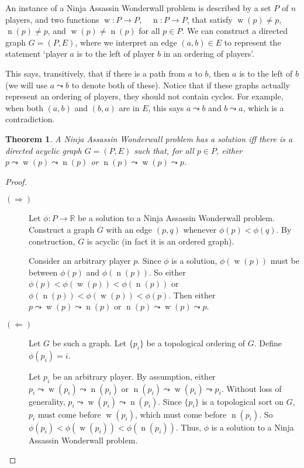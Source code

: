 \documentclass{article}
\newtheorem*{thm}{Theorem}
\DeclareMathOperator{\w}{w}
\DeclareMathOperator{\n}{n}
\begin{document}
An instance of a Ninja Assassin Wonderwall problem is described by a set $P$ of $n$ players, and two functions $\w : P \to P, \quad \n : P \to P$, that satisfy $\w(p) \neq p$, $\n(p) \neq p$, and $\w(p) \neq \n(p)$ for all $p\in P$. We can construct a directed graph $G=(P,E)$, where we interpret an edge $(a,b) \in E$ to represent the statement `player $a$ is to the left of player $b$ in an ordering of players'. 

This says, transitively, that if there is a path from $a$ to $b$, then $a$ is to the left of $b$ (we will use $a \leadsto b$ to denote both of these). Notice that if these graphs actually represent an ordering of players, they should not contain cycles. For example, when both $(a,b)$ and $(b,a)$ are in $E$, this says $a \leadsto b$ and $b \leadsto a$, which is a contradiction. 


\begin{thm}
A Ninja Assassin Wonderwall problem has a solution iff there is a directed acyclic graph $G=(P,E)$ such that, for all $p\in P$, either  $p \leadsto \w(p) \leadsto \n(p)$ or $\n(p) \leadsto \w(p) \leadsto p$.
\end{thm}
\begin{proof} \mbox{}

\begin{description}
\item[$(\Rightarrow)$] Let $\phi: P \to \mathbb{R}$ be a solution to a Ninja Assassin Wonderwall problem. Construct a graph $G$ with an edge $(p,q)$ whenever $\phi(p)<\phi(q)$. By construction, $G$ is acyclic (in fact it is an ordered graph).

Consider an arbitrary player $p$. Since $\phi$ is a solution, $\phi(\w(p))$ must be between $\phi(p)$ and $\phi(\n(p))$. So either $\phi(p) < \phi(\w(p)) < \phi(\n(p))$ or $\phi(\n(p)) < \phi(\w(p)) < \phi(p)$. Then either $p \leadsto \w(p) \leadsto \n(p)$ or $\n(p) \leadsto \w(p) \leadsto p$.

\item[$(\Leftarrow)$] Let $G$ be such a graph. Let $\{p_i\}$ be a topological ordering of $G$. Define $\phi(p_i) = i$. 

Let $p_i$ be an arbitrary player. By assumption, either $p_i \leadsto \w(p_i) \leadsto \n(p_i)$ or $\n(p_i) \leadsto \w(p_i) \leadsto p_i$. Without loss of generality, $p_i \leadsto \w(p_i) \leadsto \n(p_i)$. Since $\{p_i\}$ is a topological sort on $G$, $p_i$ must come before $\w(p_i)$, which must come before $\n(p_i)$. So $\phi(p_i) < \phi(\w(p_i)) < \phi(\n(p_i))$. Thus, $\phi$ is a solution to a Ninja Assassin Wonderwall problem.
\end{description}
\end{proof}
\end{document}
